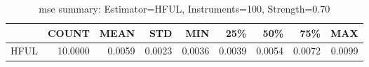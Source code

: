 \begin{table}[ht]
\centering
\caption{mse summary: Estimator=HFUL, Instruments=100, Strength=0.70}
\begin{tabular}{lrrrrrrrr}
\toprule
 & COUNT & MEAN & STD & MIN & 25\% & 50\% & 75\% & MAX \\
\midrule
HFUL & 10.0000 & 0.0059 & 0.0023 & 0.0036 & 0.0039 & 0.0054 & 0.0072 & 0.0099 \\
\bottomrule
\end{tabular}
\end{table}
